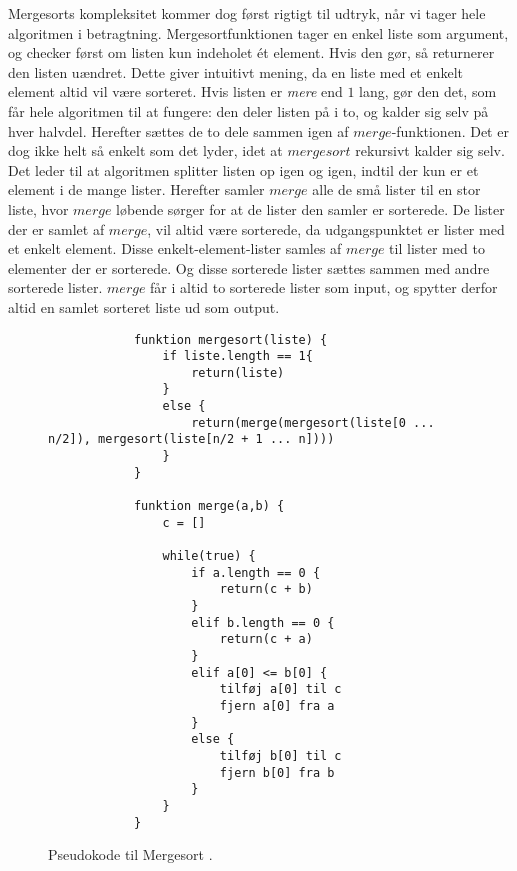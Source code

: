 Mergesorts kompleksitet kommer dog først rigtigt til udtryk, når vi tager hele algoritmen i betragtning. Mergesortfunktionen tager en enkel liste som argument, og checker først om listen kun indeholet ét element. Hvis den gør, så returnerer den listen uændret. Dette giver intuitivt mening, da en liste med et enkelt element altid vil være sorteret. Hvis listen er \emph{mere} end $1$ lang, gør den det, som får hele algoritmen til at fungere: den deler listen på i to, og kalder sig selv på hver halvdel. Herefter sættes de to dele sammen igen af $merge$-funktionen. Det er dog ikke helt så enkelt som det lyder, idet at $mergesort$ rekursivt kalder sig selv. Det leder til at algoritmen splitter listen op igen og igen, indtil der kun er et element i de mange lister. Herefter samler $merge$ alle de små lister til en stor liste, hvor $merge$ løbende sørger for at de lister den samler er sorterede. De lister der er samlet af $merge$, vil altid være sorterede, da udgangspunktet er lister med et enkelt element. Disse enkelt-element-lister samles af $merge$ til lister med to elementer der er sorterede. Og disse sorterede lister sættes sammen med andre sorterede lister. $merge$ får i altid to sorterede lister som input, og spytter derfor altid en samlet sorteret liste ud som output.


\begin{figure}
	\begin{center}
		\begin{lstlisting}
			funktion mergesort(liste) {
				if liste.length == 1{
					return(liste)
				}
				else {
					return(merge(mergesort(liste[0 ... n/2]), mergesort(liste[n/2 + 1 ... n])))
				}
			}

			funktion merge(a,b) {
				c = []

				while(true) {
					if a.length == 0 {
						return(c + b)
					}
					elif b.length == 0 {
						return(c + a)
					}
					elif a[0] <= b[0] {
						tilføj a[0] til c
						fjern a[0] fra a
					}
					else {
						tilføj b[0] til c
						fjern b[0] fra b
					}
				}
			}

		\end{lstlisting}
	\end{center}
	\vspace{-5mm}
	\caption{Pseudokode til Mergesort \cite[s. 106]{aogd}.}
	\label{fig:Pseudokode til mergesort}
\end{figure}




